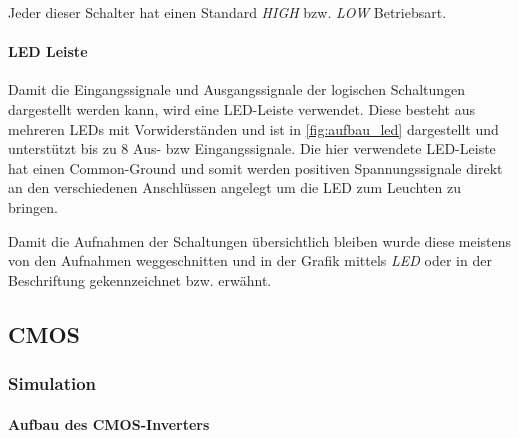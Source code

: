 \documentclass[12pt,english,ngerman]{scrartcl}
\begin{document}
Jeder dieser Schalter hat einen Standard \textit{HIGH} bzw.
\textit{LOW} Betriebsart.

\begin{figure}[H]
  \centering
  \caption{}
  \label{fig:aufbau_schalter}
\end{figure}


\paragraph{LED Leiste}
Damit die Eingangssignale und Ausgangssignale der logischen Schaltungen
dargestellt werden kann, wird eine LED-Leiste verwendet. Diese besteht aus
mehreren LEDs mit Vorwiderständen und ist in \autoref{fig:aufbau_led} dargestellt und
unterstützt bis zu 8 Aus- bzw Eingangssignale. Die hier verwendete LED-Leiste
hat einen Common-Ground und somit werden positiven Spannungssignale direkt an den
verschiedenen Anschlüssen angelegt um die LED zum Leuchten zu bringen.

\begin{figure}[H]
  \centering
  \caption{}
  \label{fig:aufbau_led}
\end{figure}

Damit die Aufnahmen der Schaltungen übersichtlich bleiben wurde diese meistens
von den Aufnahmen weggeschnitten und in der Grafik mittels \textit{LED} oder in
der Beschriftung gekennzeichnet bzw. erwähnt.

\subsection{CMOS}
\subsubsection{Simulation}
\paragraph{Aufbau des CMOS-Inverters}


\begin{figure}[H]
  \centering
  \caption{}
  \label{fig:sim_aufbau_inv}
\end{figure}
\end{document}
